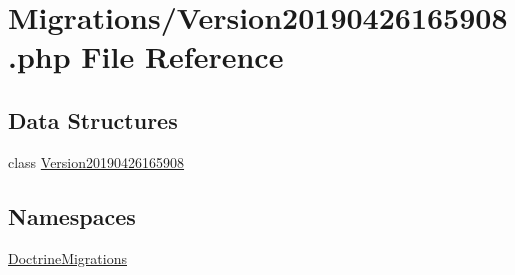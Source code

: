 \hypertarget{_version20190426165908_8php}{}\section{Migrations/\+Version20190426165908.php File Reference}
\label{_version20190426165908_8php}
\subsection*{Data Structures}
\begin{DoxyCompactItemize}
\item 
class \mbox{\hyperlink{class_doctrine_migrations_1_1_version20190426165908}{Version20190426165908}}
\end{DoxyCompactItemize}
\subsection*{Namespaces}
\begin{DoxyCompactItemize}
\item 
 \mbox{\hyperlink{namespace_doctrine_migrations}{Doctrine\+Migrations}}
\end{DoxyCompactItemize}
